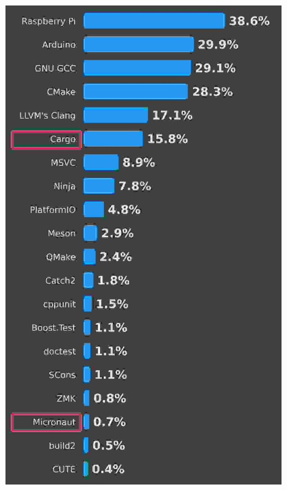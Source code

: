 \documentclass{beamer}
\begin{document}
\begin{frame}
\begin{columns}
\begin{column}{.60\textwidth}
		\end{column}
		\begin{column}{.40\textwidth}
			\begin{figure}
				\includegraphics[height=0.7\textheight]{img/so-survey.jpg}
				\centering
				\caption{ \cite{so-survey}}
			\end{figure}
		\end{column}
	\end{columns}
\end{frame}
\end{document}
